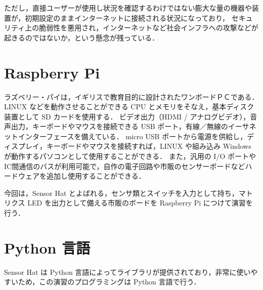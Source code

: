 \documentclass[11pt,a4,epsf]{report}
\begin{document}
ただし，直接ユーザーが使用し状況を確認するわけではない膨大な量の機器や装置が，初期設定のままインターネットに接続される状況になっており，
セキュリティ上の脆弱性を悪用され，インターネットなど社会インフラへの攻撃などが起きるのではないか，という懸念が残っている．

\section{Raspberry Pi}

ラズベリー・パイは，イギリスで教育目的に設計されたワンボードＰＣである．
LINUX などを動作させることができる CPU とメモリをそなえ，基本ディスク装置として SD カードを使用する．
ビデオ出力（HDMI / アナログビデオ），音声出力，キーボードやマウスを接続できる USB ポート，有線／無線のイーサネットインターフェースを備えている．
micro USB ポートから電源を供給し，ディスプレイ，キーボードやマウスを接続すれば，LINUX や組み込み Windows が動作するパソコンとして使用することができる．
また，汎用の I/O ポートやIC間通信のバスが利用可能で，自作の電子回路や市販のセンサーボードなどハードウェアを追加し使用することができる．

今回は，Sensor Hat  とよばれる，センサ類とスイッチを入力として持ち，マトリクス LED を出力として備える市販のボードを Raspberry Pi につけて演習を行う．


\section{Python 言語}

Sensor Hat は Python 言語によってライブラリが提供されており，非常に使いやすいため，この演習のプログラミングは Python 言語で行う．
\end{document}
